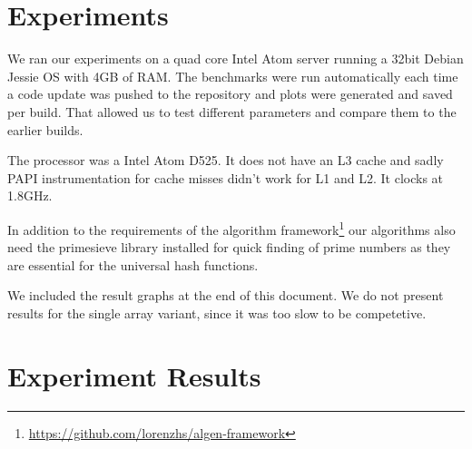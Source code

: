 \documentclass{article}
\begin{document}
\section{Experiments}

We ran our experiments on a quad core Intel Atom server running a 32bit Debian
Jessie OS with 4GB of RAM. The benchmarks were run automatically each time a
code update was pushed to the repository and plots were generated and saved per
build. That allowed us to test different parameters and compare them to the
earlier builds.

The processor was a Intel Atom D525. It does not have an L3 cache and sadly PAPI
instrumentation for cache misses didn't work for L1 and L2. It clocks at 1.8GHz.

In addition to the requirements of the algorithm
framework\footnote{\href{https://github.com/lorenzhs/algen-framework}{https://github.com/lorenzhs/algen-framework}}
our algorithms also need the primesieve library installed for quick finding of
prime numbers as they are essential for the universal hash functions.

We included the result graphs at the end of this document. We do not present
results for the single array variant, since it was too slow to be competetive.\\

\printbibliography

\section*{Experiment Results}
\end{document}
